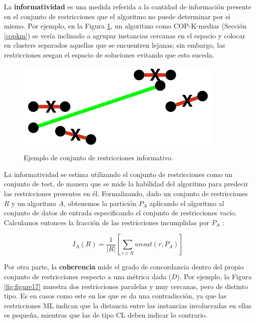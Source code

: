 La \textbf{informatividad} es una medida referida a la cantidad de información presente en el conjunto de restricciones que el algoritmo no puede determinar por sí mismo. Por ejemplo, en la Figura \ref{fig:figure16}, un algoritmo como COP-K-medias (Sección \ref{copkm}) se vería inclinado a agrupar instancias cercanas en el espacio y colocar en clusters separados aquellas que se encuentren lejanas; sin embargo, las restricciones sesgan el espacio de soluciones evitando que esto suceda. 

\begin{figure}[!h]
	\centering
	\includegraphics[scale=0.4]{imagenes/c3/Inform/Inform} 
	\caption[Ejemplo de conjunto de restricciones informativo.]{Ejemplo de conjunto de restricciones informativo. \cite{Survey:2007}}\label{fig:figure16}
\end{figure}


La informatividad se estima utilizando el conjunto de restricciones como un conjunto de test, de manera que se mide la habilidad del algoritmo para predecir las restricciones presentes en él. Formalizando, dado un conjunto de restricciones $R$ y un algoritmo $A$, obtenemos la partición $P_A$ aplicando el algoritmo al conjunto de datos de entrada especificando el conjunto de restricciones vacío. Calculamos entonces la fracción de las restricciones incumplidas por $P_A$ \cite{Survey:2007}:

\begin{equation}
I_A(R) = \frac{1}{|R|}\left[ \sum_{r \in R} unsat(r, P_A) \right] 
\end{equation}

\clearpage

Por otra parte, la \textbf{coherencia} mide el grado de concordancia dentro del propio conjunto de restricciones respecto a una métrica dada ($D$). Por ejemplo, la Figura \ref{fig:figure17} muestra dos restricciones paralelas y muy cercanas, pero de distinto tipo. Es en casos como este en los que se da una contradicción, ya que las restricciones \acf{ML} indican que la distancia entre las instancias involucradas en ellas es pequeña, mientras que las de tipo \acf{CL} deben indicar lo contrario.

